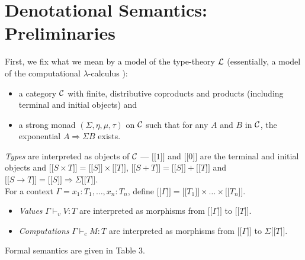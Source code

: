 \documentclass{eptcs}
\def\[{\ensuremath{[ \! [}}
\def\]{\ensuremath{] \! ]}}
\def\C{{\cal{C}}}
\def\L{{\cal{L}}}
\newcommand{\emp}{{{0}}}
\newcommand{\com}{{{1}}}
\begin{document}
\section{Denotational Semantics: Preliminaries}
First, we fix what we mean by a model of the type-theory $\L$ (essentially, a model of the computational $\lambda$-calculus \cite{MogC}): 
\begin{itemize}
\item a category $\C$ with finite, distributive  coproducts and products (including terminal and initial objects) and 
\item a strong monad $(\Sigma,\eta,\mu,\tau)$ on $\C$ such that for any $A$ and $B$ in $\C$, the exponential $A \Rightarrow \Sigma B$ exists. 
\end{itemize}
\emph{Types} are interpreted  as objects of $\C$  ---  $\[\com\]$ and  $\[\emp\]$ are the terminal and initial objects and  $\[S \times T\] = \[S\] \times \[T\]$, $\[S + T\] = \[S\] + \[T\]$ and  $\[S \rightarrow T\] = \[S\] \Rightarrow \Sigma \[T\]$. \\
For a context $\Gamma = x_1:T_1,\ldots, x_n:T_n$, define $\[\Gamma\] = \[T_1\]\times \ldots \times \[T_n\]$.  
\begin{itemize}
\item \emph{Values} $\Gamma \vdash_v V:T$ are interpreted as morphisms from $\[\Gamma\]$ to $\[T\]$.  
\item \emph{Computations} $\Gamma \vdash_c M:T$ are interpreted as  morphisms from $\[\Gamma\]$ to $\Sigma\[T\]$. 
\end{itemize}
Formal semantics  are given in Table 3.
\end{document}
